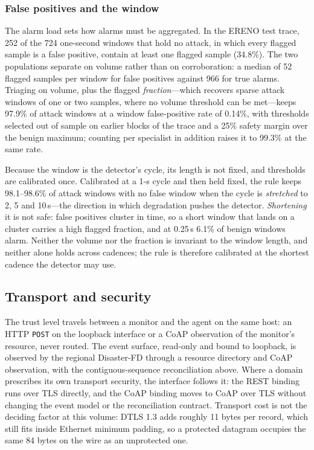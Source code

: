 \subsubsection{False positives and the window}
\label{sec:api-fp}

The alarm load sets how alarms must be aggregated. In the ERENO test trace, 252 of the 724
one-second windows that hold no attack, in which every flagged sample is a false positive,
contain at least one flagged sample (34.8\%). The two populations separate on volume rather
than on corroboration: a median of 52 flagged samples per window for false positives against
966 for true alarms. Triaging on volume, plus the flagged \emph{fraction}---which recovers
sparse attack windows of one or two samples, where no volume threshold can be met---keeps
97.9\% of attack windows at a window false-positive rate of 0.14\%, with thresholds
selected out of sample on earlier blocks of the trace and a 25\% safety margin over the
benign maximum; counting per specialist in addition raises it to 99.3\% at the same rate.

Because the window is the detector's cycle, its length is not fixed, and thresholds are
calibrated once. Calibrated at a 1-s cycle and then held fixed, the rule keeps 98.1--98.6\%
of attack windows with no false window when the cycle is \emph{stretched} to 2, 5 and
10\,s---the direction in which degradation pushes the detector. \emph{Shortening} it is not
safe: false positives cluster in time, so a short window that lands on a cluster carries a
high flagged fraction, and at 0.25\,s 6.1\% of benign windows alarm. Neither the volume nor
the fraction is invariant to the window length, and neither alone holds across cadences;
the rule is therefore calibrated at the shortest cadence the detector may use.

\subsection{Transport and security}
\label{sec:api-security}

The trust level travels between a monitor and the agent on the same host: an HTTP
\texttt{POST} on the loopback interface or a CoAP observation of the monitor's resource,
never routed. The event surface, read-only and bound to loopback, is observed by the
regional Disaster-FD through a resource directory and CoAP observation, with the
contiguous-sequence reconciliation above. Where a domain prescribes its own transport
security, the interface follows it: the REST binding runs over TLS directly, and the CoAP
binding moves to CoAP over TLS without changing the event model or the reconciliation
contract. Transport cost is not the deciding factor at this volume: DTLS 1.3 adds roughly
11 bytes per record, which still fits inside Ethernet minimum padding, so a protected
datagram occupies the same 84 bytes on the wire as an unprotected one.

